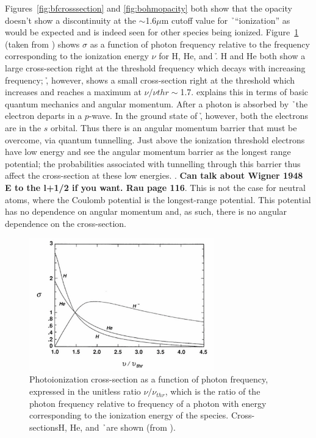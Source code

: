 Figures~\ref{fig:bfcrosssection} and \ref{fig:bohmopacity} both show that the opacity doesn't show a discontinuity at the $\sim$1.6$\mu$m cutoff value for \h\ ``ionization'' as would be expected and is indeed seen for other species being ionized.  Figure~\ref{fig:bethe} (taken from \citealt{bethe1977}) shows $\sigma$ as a function of photon frequency relative to the frequency corresponding to the ionization energy $\nu$ for H, He, and \h.  H and He both show a large cross-section right at the threshold frequency which decays with increasing frequency; \h, however, shows a small cross-section right at the threshold which increases and reaches a maximum at $\nu/\nu{thr}\sim$1.7.  \cite{rau1996} explains this in terms of basic quantum mechanics and angular momentum.  After a photon is absorbed by \h\ the electron departs in a $p$-wave.  In the ground state of \h, however, both the electrons are in the $s$ orbital.  Thus there is an angular momentum barrier that must be overcome, via quantum tunnelling.  Just above the ionization threshold electrons have low energy and see the angular momentum barrier as the longest range potential; the probabilities associated with tunnelling through this barrier thus affect the cross-section at these low energies. .  {\bf Can talk about Wigner 1948 E to the l+1/2 if you want. Rau page 116}.  This is not the case for neutral atoms, where the Coulomb potential is the longest-range potential.  This potential has no dependence on angular momentum and, as such, there is no angular dependence on the cross-section.
\begin{figure}
\includegraphics[width=80mm]{figs/betheplot.png}
\caption{\label{fig:bethe}Photoionization cross-section as a function of photon frequency, expressed in the unitless ratio $\nu/\nu_{thr}$, which is the ratio of the photon frequency relative to frequency of a photon with energy corresponding to the ionization energy of the species.  Cross-sectionsH, He, and \h\ are shown (from \citealt{bethe1977}).}
\end{figure}
